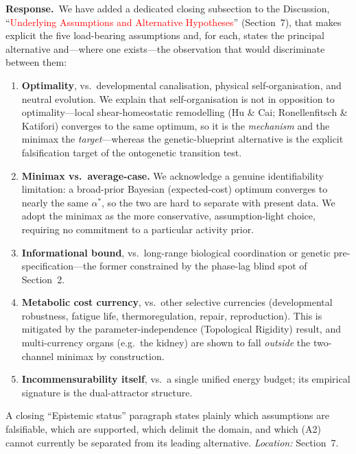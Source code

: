 \documentclass[11pt]{article}
\newcommand{\rtwo}[1]{\textcolor{red}{#1}}
\newcommand{\response}{\par\medskip\noindent\textbf{Response.}\ }
\begin{document}
\response We have added a dedicated closing subsection to the Discussion,
``\rtwo{Underlying Assumptions and Alternative Hypotheses}'' (Section~7),
that makes explicit the five load-bearing assumptions
and, for each, states the principal alternative and---where one exists---the
observation that would discriminate between them:
\begin{enumerate}[label=(A\arabic*),leftmargin=2.2em,itemsep=2pt,topsep=3pt]
  \item \textbf{Optimality}, vs.\ developmental canalisation, physical
        self-organisation, and neutral evolution. We explain that
        self-organisation is not in opposition to optimality---local
        shear-homeostatic remodelling (Hu \& Cai; Ronellenfitsch \& Katifori)
        converges to the same optimum, so it is the \emph{mechanism} and the
        minimax the \emph{target}---whereas the genetic-blueprint alternative is
        the explicit falsification target of the ontogenetic transition test.
  \item \textbf{Minimax vs.\ average-case.} We acknowledge a genuine identifiability limitation: a broad-prior Bayesian (expected-cost) optimum converges
        to nearly the same $\alpha^*$, so the two are hard to separate with
        present data. We adopt the minimax as the more conservative,
        assumption-light choice, requiring no commitment to a particular
        activity prior.
  \item \textbf{Informational bound}, vs.\ long-range biological coordination or
        genetic pre-specification---the former constrained by the phase-lag
        blind spot of Section~2.
  \item \textbf{Metabolic cost currency}, vs.\ other selective currencies
        (developmental robustness, fatigue life, thermoregulation, repair,
        reproduction). This is mitigated by the parameter-independence
        (Topological Rigidity) result, and multi-currency organs (e.g.\ the
        kidney) are shown to fall \emph{outside} the two-channel minimax by
        construction.
  \item \textbf{Incommensurability itself}, vs.\ a single unified energy budget;
        its empirical signature is the dual-attractor structure.
\end{enumerate}
A closing ``Epistemic status'' paragraph states plainly which assumptions are
falsifiable, which are supported, which delimit the domain, and which (A2)
cannot currently be separated from its leading alternative.
\emph{Location:} Section~7.
\end{document}
